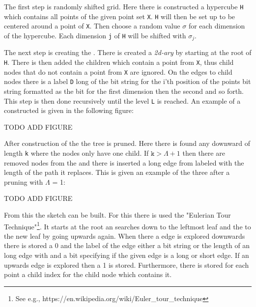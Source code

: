 The first step is randomly shifted grid. Here there is constructed a hypercube \texttt{H} which contains all points of the given point set \texttt{X}. \texttt{H} will then be set up to be centered around a point of \texttt{X}. Then choose a random value $\sigma$ for each dimension of the hypercube. Each dimension \texttt{j} of \texttt{H} will be shifted with $\sigma_j$.

The next step is creating the \qt{}. There is created a \textit{2d-ary} \qt{} by starting at the root of \texttt{H}. There is then added the children which contain a point from \texttt{X}, thus child nodes that do not contain a point from \texttt{X} are ignored. On the edges to child nodes there is a label \texttt{D} long of the bit string for the i'th position of the points bit string formatted as the bit for the first dimension then the second and so forth. This step is then done recursively until the level \texttt{L} is reached. An example of a constructed \qt{} is given in the following figure:

TODO ADD FIGURE

After construction of the \qt{} the tree is pruned. Here there is found any downward of length \texttt{k} where the nodes only have one child. If \ensuremath{\texttt{k} > \Lambda+1} then there are removed nodes  from the \qt{} and there is inserted a long edge from  labeled with the length of the path it replaces. This is given an example of the three after a pruning with $\Lambda$ = 1:

TODO ADD FIGURE

From this the sketch can be built. For this there is used the "Eulerian Tour Technique"\footnote{See e.g., https://en.wikipedia.org/wiki/Euler\_tour\_technique}.
It starts at the root an searches down to the leftmost leaf and the to the new leaf by going upwards again. When there a edge is explored downwards there is stored a 0 and the label of the edge either a bit string or the length of an long edge with and a bit specifying if the given edge is a long or short edge. If an upwards edge is explored then a 1 is stored. Furthermore, there is stored for each point a child index for the child node which contains it.

